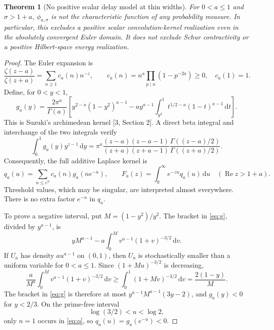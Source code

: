 \documentclass[11pt,letterpaper]{article}
\newtheorem{theorem}{Theorem}
\newcommand{\Rea}{\operatorname{Re}}
\newcommand{\dd}{\mathrm d}
\begin{document}
\begin{theorem}[No positive scalar delay model at thin widths]\label{thm:negative}
For $0<a\leq1$ and $\sigma>1+a$, $\phi_{a,\sigma}$ is not the characteristic function of any probability measure. In particular, this excludes a positive scalar convolution-kernel realization even in the absolutely convergent Euler domain. It does not exclude Schur contractivity or a positive Hilbert-space energy realization.
\end{theorem}
\begin{proof}
The Euler expansion is
\[
 \frac{\zeta(z-a)}{\zeta(z+a)}=\sum_{n\geq1}c_a(n)n^{-z},\qquad
 c_a(n)=n^a\prod_{p\mid n}(1-p^{-2a})\geq0,\quad c_a(1)=1.
\]
Define, for $0<y<1$,
\begin{equation}\label{eq:g}
 g_a(y)=\frac{2\pi^a}{\Gamma(a)}\left[
 y^{2-a}(1-y^2)^{a-1}
 -a y^{a-1}\int_{y^2}^{1}t^{1/2-a}(1-t)^{a-1}\,\dd t\right].
\end{equation}
This is Suzuki's archimedean kernel [3, Section 2]. A direct beta integral and interchange of the two integrals verify
\[
 \int_0^1 g_a(y)y^{z-1}\,\dd y
 =\pi^a\frac{(z-a)(z-a-1)}{(z+a)(z+a-1)}
   \frac{\Gamma((z-a)/2)}{\Gamma((z+a)/2)}.
\]
Consequently, the full additive Laplace kernel is
\begin{equation}\label{eq:q}
 q_a(u)=\sum_{n\leq e^u}c_a(n)g_a(ne^{-u}),\qquad
 F_a(z)=\int_0^\infty e^{-zu}q_a(u)\,\dd u
 \quad(\Rea z>1+a).
\end{equation}
Threshold values, which may be singular, are interpreted almost everywhere. There is no extra factor $e^{-u}$ in $q_a$.

To prove a negative interval, put $M=(1-y^2)/y^2$. The bracket in \eqref{eq:g}, divided by $y^{a-1}$, is
\[
 yM^{a-1}-a\int_0^M v^{a-1}(1+v)^{-3/2}\,\dd v.
\]
If $U_a$ has density $au^{a-1}$ on $(0,1)$, then $U_a$ is stochastically smaller than a uniform variable for $0<a\leq1$. Since $(1+Mu)^{-3/2}$ is decreasing,
\[
 \frac{a}{M^a}\int_0^M v^{a-1}(1+v)^{-3/2}\,\dd v
 \geq\int_0^1(1+Mv)^{-3/2}\,\dd v
 =\frac{2(1-y)}{M}.
\]
The bracket in \eqref{eq:g} is therefore at most $y^{a-1}M^{a-1}(3y-2)$, and $g_a(y)<0$ for $y<2/3$. On the prime-free interval
\begin{equation}\label{eq:negativeinterval}
 \log(3/2)<u<\log2,
\end{equation}
only $n=1$ occurs in \eqref{eq:q}, so $q_a(u)=g_a(e^{-u})<0$.


\end{proof}
\end{document}
